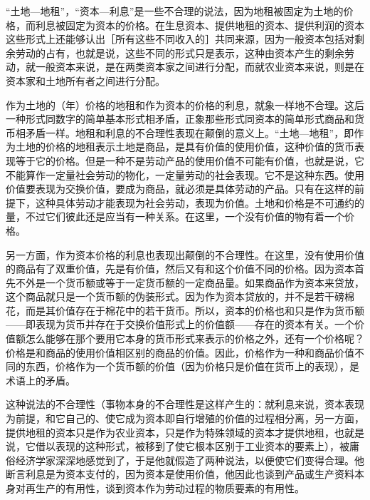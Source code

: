 
“土地—地租”，“资本—利息”是一些不合理的说法，因为地租被固定为土地的价格，而利息被固定为资本的价格。在生息资本、提供地租的资本、提供利润的资本这些形式上还能够认出［所有这些不同收入的］共同来源，因为一般资本包括对剩余劳动的占有，也就是说，这些不同的形式只是表示，这种由资本产生的剩余劳动，就一般资本来说，是在两类资本家之间进行分配，而就农业资本来说，则是在资本家和土地所有者之间进行分配。

作为土地的（年）价格的地租和作为资本的价格的利息，就象一样地不合理。这后一种形式同数字的简单基本形式相矛盾，正象那些形式同资本的简单形式商品和货币相矛盾一样。地租和利息的不合理性表现在颠倒的意义上。“土地—地租”，即作为土地的价格的地租表示土地是商品，是具有价值的使用价值，这种价值的货币表现等于它的价格。但是一种不是劳动产品的使用价值不可能有价值，也就是说，它不能算作一定量社会劳动的物化，一定量劳动的社会表现。它不是这种东西。使用价值要表现为交换价值，要成为商品，就必须是具体劳动的产品。只有在这样的前提下，这种具体劳动才能表现为社会劳动，表现为价值。土地和价格是不可通约的量，不过它们彼此还是应当有一种关系。在这里，一个没有价值的物有着一个价格。

\todo{}

另一方面，作为资本价格的利息也表现出颠倒的不合理性。在这里，没有使用价值的商品有了双重价值，先是有价值，然后又有和这个价值不同的价格。因为资本首先不外是一个货币额或等于一定货币额的一定商品量。如果商品作为资本来贷放，这个商品就只是一个货币额的伪装形式。因为作为资本贷放的，并不是若干磅棉花，而是其价值存在于棉花中的若干货币。所以，资本的价格也和只是作为货币额——即表现为货币并存在于交换价值形式上的价值额——存在的资本有关。一个价值额怎么能够在那个要用它本身的货币形式来表示的价格之外，还有一个价格呢？价格是和商品的使用价值相区别的商品的价值。因此，价格作为一种和商品价值不同的东西，价格作为一个货币额的价值（因为价格只是价值在货币上的表现），是术语上的矛盾。

这种说法的不合理性（事物本身的不合理性是这样产生的：就利息来说，资本表现为前提，和它自己的、使它成为资本即自行增殖的价值的过程相分离，另一方面，提供地租的资本只是作为农业资本，只是作为特殊领域的资本才提供地租，也就是说，它借以表现的这种形式，被移到了使它根本区别于工业资本的要素上），被庸俗经济学家深深地感觉到了，于是他就假造了两种说法，以便使它们变得合理。他断言利息是为资本支付的，因为资本是使用价值，他因此也谈到产品或生产资料本身对再生产的有用性，谈到资本作为劳动过程的物质要素的有用性。

